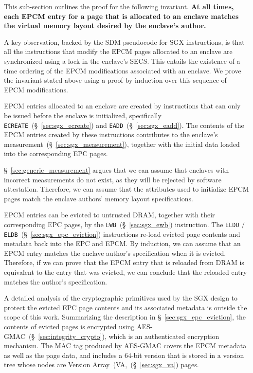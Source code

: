 
This sub-section outlines the proof for the following invariant. \textbf{At
all times, each EPCM entry for a page that is allocated to an enclave matches
the virtual memory layout desired by the enclave's author.}

A key observation, backed by the SDM pseudocode for SGX instructions, is that
all the instructions that modify the EPCM pages allocated to an enclave are
synchronized using a lock in the enclave's SECS. This entails the existence of
a time ordering of the EPCM modifications associated with an enclave. We prove
the invariant stated above using a proof by induction over this sequence of
EPCM modifications.

EPCM entries allocated to an enclave are created by instructions that can only
be issued before the enclave is initialized, specifically
\texttt{ECREATE}~(\S~\ref{sec:sgx_ecreate}) and
\texttt{EADD}~(\S~\ref{sec:sgx_eadd}). The contents of the EPCM entries created
by these instructions contributes to the enclave's
measurement~(\S~\ref{sec:sgx_measurement}), together with the initial data
loaded into the corresponding EPC pages.

\S~\ref{sec:generic_measurement} argues that we can assume that enclaves with
incorrect measurements do not exist, as they will be rejected by software
attestation. Therefore, we can assume that the attributes used to initialize
EPCM pages match the enclave authors' memory layout specifications.

EPCM entries can be evicted to untrusted DRAM, together with their
corresponding EPC pages, by the \texttt{EWB}~(\S~\ref{sec:sgx_ewb})
instruction.  The \texttt{ELDU} / \texttt{ELDB}~(\S~\ref{sec:sgx_epc_eviction})
instructions re-load evicted page contents and metadata back into the EPC and
EPCM. By induction, we can assume that an EPCM entry matches the enclave
author's specification when it is evicted. Therefore, if we can prove that the
EPCM entry that is reloaded from DRAM is equivalent to the entry that was
evicted, we can conclude that the reloaded entry matches the author's
specification.

A detailed analysis of the cryptographic primitives used by the SGX design to
protect the evicted EPC page contents and its associated metadata is outside
the scope of this work. Summarizing the description in
\S~\ref{sec:sgx_epc_eviction}, the contents of evicted pages is encrypted using
AES-GMAC~(\S~\ref{sec:integrity_crypto}), which is an authenticated encryption
mechanism. The MAC tag produced by AES-GMAC covers the EPCM metadata as well as
the page data, and includes a 64-bit version that is stored in a version tree
whose nodes are Version Array~(VA,~(\S~\ref{sec:sgx_va}) pages.

